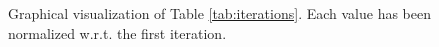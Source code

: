 \begin{figure}[H]
	\centering
{}
\end{figure}

\begin{figure}[H]
	\centering
	\caption{Graphical visualization of Table \ref{tab:iterations}. Each value has been normalized w.r.t. the first iteration. } \label{fig:iterations}
\end{figure}

